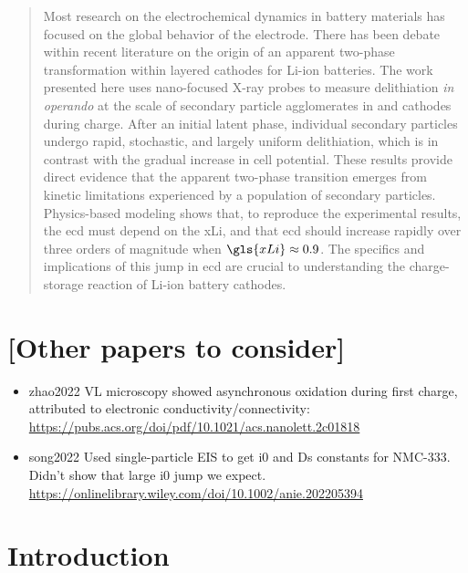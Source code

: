 \documentclass{article}
\begin{document}
\maketitle

\begin{abstract}
  Most research on the electrochemical dynamics in battery materials
  has focused on the global behavior of the electrode. There has been
  debate within recent literature on the origin of an apparent
  two-phase transformation within layered cathodes for Li-ion
  batteries. The work presented here uses nano-focused X-ray probes to
  measure delithiation \textit{in operando} at the scale of secondary
  particle agglomerates in \nca{} and \nmc{} cathodes during
  charge. After an initial latent phase, individual secondary
  particles undergo rapid, stochastic, and largely uniform
  delithiation, which is in contrast with the gradual increase in cell
  potential. These results provide direct evidence that the apparent
  two-phase transition emerges from kinetic limitations experienced by
  a population of secondary particles. Physics-based modeling shows
  that, to reproduce the experimental results, the \gls{ecd} must depend
  on the \gls{xLi}, and that \gls{ecd} should increase rapidly over three
  orders of magnitude when $\gls{xLi} \approx 0.9$. The specifics and
  implications of this jump in \gls{ecd} are crucial to understanding
  the charge-storage reaction of Li-ion battery cathodes.
\end{abstract}


\section{[Other papers to consider]}
\begin{itemize}
\item zhao2022\cite{zhao2022} VL microscopy showed asynchronous oxidation during first charge, attributed to electronic conductivity/connectivity: \url{https://pubs.acs.org/doi/pdf/10.1021/acs.nanolett.2c01818}
\item song2022\cite{song2022} Used single-particle EIS to get i0 and Ds constants for NMC-333. Didn't show that large i0 jump we expect. \url{https://onlinelibrary.wiley.com/doi/10.1002/anie.202205394}
\end{itemize}

\section{Introduction}
\end{document}
